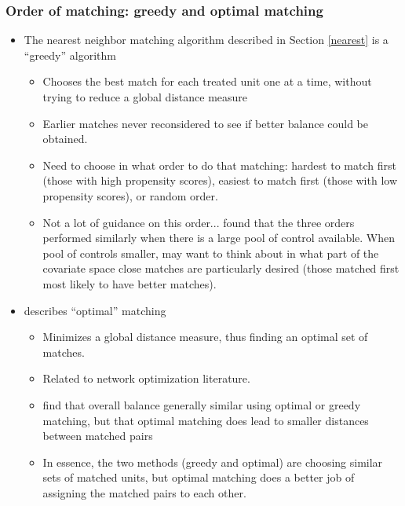 \documentclass[11pt,titlepage]{article}
\begin{document}
\subsubsection{Order of matching: greedy and optimal matching}
\begin{itemize}
\item The nearest neighbor matching algorithm described in Section \ref{nearest} is a ``greedy'' algorithm
\begin{itemize} \item Chooses the best match for each treated unit one at a time, without trying to reduce a global distance measure
                \item Earlier matches never reconsidered to see if better balance could be obtained.
                \item Need to choose in what order to do that matching: hardest to match first (those with high propensity scores), easiest to match first
(those with low propensity scores), or random order.  
                \item Not a lot of guidance on this order...\cite{Rubin73a} found that the three orders performed similarly
when there is a large pool of control available.  When pool of controls smaller, may want to think about in what part of the covariate space close matches
are particularly desired (those matched first most likely to have better matches).  
\end{itemize}
\item \cite{Rosenbaum02} describes ``optimal'' matching
\begin{itemize} \item Minimizes a global distance measure, thus finding an optimal set of matches.  
                \item Related to network optimization literature.
                \item \cite{GuRos93} find that overall balance generally similar using optimal or greedy matching, 
but that optimal matching does lead to smaller distances between matched pairs
                \item In essence, the two methods (greedy and optimal) are choosing similar sets of matched units, 
but optimal matching does a better job of assigning the matched pairs to each other.  
\end{itemize}
\end{itemize}
\end{document}
